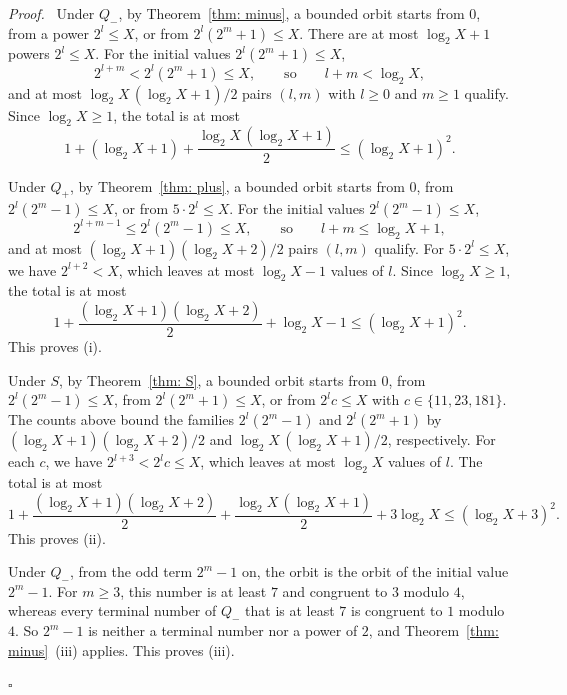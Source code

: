 \documentclass{article}
\newenvironment{proof}[1][Proof]{\par\medskip\noindent\textit{#1.}\ }{\hfill$\square$\par\medskip}
\newcommand{\Le}{\leqslant}
\newcommand{\Ge}{\geqslant}
\begin{document}
\begin{proof}
    Under $Q_-$, by Theorem~\ref{thm: minus}, a bounded orbit starts from $0$, from a power $2^l \Le X$, or from $2^l (2^m + 1) \Le X$. There are at most $\log_2 X + 1$ powers $2^l \Le X$. For the initial values $2^l (2^m + 1) \Le X$,
    \begin{equation*}
        2^{l+m} < 2^l (2^m + 1) \Le X , \qquad \text{so} \qquad l + m < \log_2 X ,
    \end{equation*}
    and at most $\log_2 X \, (\log_2 X + 1)/2$ pairs $(l, m)$ with $l \Ge 0$ and $m \Ge 1$ qualify. Since $\log_2 X \Ge 1$, the total is at most
    \begin{equation*}
        1 + (\log_2 X + 1) + \frac{\log_2 X \, (\log_2 X + 1)}{2} \Le (\log_2 X + 1)^2 .
    \end{equation*}

    Under $Q_+$, by Theorem~\ref{thm: plus}, a bounded orbit starts from $0$, from $2^l (2^m - 1) \Le X$, or from $5 \cdot 2^l \Le X$. For the initial values $2^l (2^m - 1) \Le X$,
    \begin{equation*}
        2^{l+m-1} \Le 2^l (2^m - 1) \Le X , \qquad \text{so} \qquad l + m \Le \log_2 X + 1 ,
    \end{equation*}
    and at most $(\log_2 X + 1)(\log_2 X + 2)/2$ pairs $(l, m)$ qualify. For $5 \cdot 2^l \Le X$, we have $2^{l+2} < X$, which leaves at most $\log_2 X - 1$ values of $l$. Since $\log_2 X \Ge 1$, the total is at most
    \begin{equation*}
        1 + \frac{(\log_2 X + 1)(\log_2 X + 2)}{2} + \log_2 X - 1 \Le (\log_2 X + 1)^2 .
    \end{equation*}
    This proves (i).

    Under $S$, by Theorem~\ref{thm: S}, a bounded orbit starts from $0$, from $2^l (2^m - 1) \Le X$, from $2^l (2^m + 1) \Le X$, or from $2^l c \Le X$ with $c \in \{11, 23, 181\}$. The counts above bound the families $2^l (2^m - 1)$ and $2^l (2^m + 1)$ by $(\log_2 X + 1)(\log_2 X + 2)/2$ and $\log_2 X \, (\log_2 X + 1)/2$, respectively. For each $c$, we have $2^{l+3} < 2^l c \Le X$, which leaves at most $\log_2 X$ values of $l$. The total is at most
    \begin{equation*}
        1 + \frac{(\log_2 X + 1)(\log_2 X + 2)}{2} + \frac{\log_2 X \, (\log_2 X + 1)}{2} + 3 \log_2 X \Le (\log_2 X + 3)^2 .
    \end{equation*}
    This proves (ii).

    Under $Q_-$, from the odd term $2^m - 1$ on, the orbit is the orbit of the initial value $2^m - 1$. For $m \Ge 3$, this number is at least $7$ and congruent to $3$ modulo $4$, whereas every terminal number of $Q_-$ that is at least $7$ is congruent to $1$ modulo $4$. So $2^m - 1$ is neither a terminal number nor a power of $2$, and Theorem~\ref{thm: minus}~(iii) applies. This proves (iii).


\end{proof}
\end{document}
